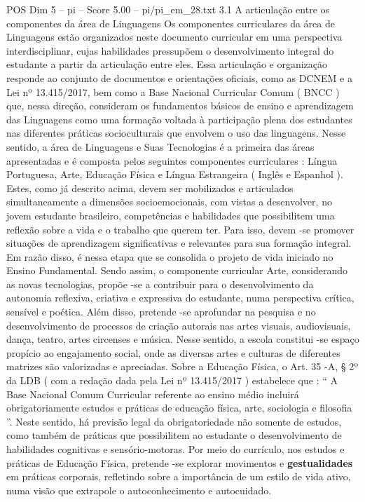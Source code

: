 \begin{textsample}{POS Dim 5 – pi – Score 5.00 – pi/pi\_em\_28.txt}  \label{ex:f5_pos_234}
3.1 A articulação entre os componentes da área de Linguagens Os componentes curriculares da área de Linguagens estão organizados neste documento curricular em uma perspectiva interdisciplinar, cujas habilidades pressupõem o desenvolvimento integral do estudante a partir da articulação entre eles.
Essa articulação e organização responde ao conjunto de documentos e orientações oficiais, como as DCNEM e a Lei nº 13.415/2017, bem como a Base Nacional Curricular Comum ( BNCC ) que, nessa direção, consideram os fundamentos básicos de ensino e aprendizagem das Linguagens como uma formação voltada à participação plena dos estudantes nas diferentes práticas socioculturais que envolvem o uso das linguagens.
Nesse sentido, a área de Linguagens e Suas Tecnologias é a primeira das áreas apresentadas e é composta pelos seguintes componentes curriculares : Língua Portuguesa, Arte, Educação Física e Língua Estrangeira ( Inglês e Espanhol ).
Estes, como já descrito acima, devem ser mobilizados e articulados simultaneamente a dimensões socioemocionais, com vistas a desenvolver, no jovem estudante brasileiro, competências e habilidades que possibilitem uma reflexão sobre a vida e o trabalho que querem ter.
Para isso, devem -se promover situações de aprendizagem significativas e relevantes para sua formação integral.
Em razão disso, é nessa etapa que se consolida o projeto de vida iniciado no Ensino Fundamental.
Sendo assim, o componente curricular Arte, considerando as novas tecnologias, propõe -se a contribuir para o desenvolvimento da autonomia reflexiva, criativa e expressiva do estudante, numa perspectiva crítica, sensível e poética.
Além disso, pretende -se aprofundar na pesquisa e no desenvolvimento de processos de criação autorais nas artes visuais, audiovisuais, dança, teatro, artes circenses e música.
Nesse sentido, a escola constitui -se espaço propício ao engajamento social, onde as diversas artes e culturas de diferentes matrizes são valorizadas e apreciadas.
Sobre a Educação Física, o Art. 35 -A, § 2º da LDB ( com a redação dada pela Lei nº 13.415/2017 ) estabelece que : “ A Base Nacional Comum Curricular referente ao ensino médio incluirá obrigatoriamente estudos e práticas de educação física, arte, sociologia e filosofia ”.
Neste sentido, há previsão legal da obrigatoriedade não somente de estudos, como também de práticas que possibilitem ao estudante o desenvolvimento de habilidades cognitivas e sensório-motoras.
Por meio do currículo, nos estudos e práticas de Educação Física, pretende -se explorar movimentos e \textbf{gestualidades} em práticas corporais, refletindo sobre a importância de um estilo de vida ativo, numa visão que extrapole o autoconhecimento e autocuidado.

\end{textsample}
